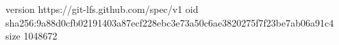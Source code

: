 version https://git-lfs.github.com/spec/v1
oid sha256:9a88d0cfb02191403a87ecf228ebc3e73a50c6ae3820275f7f23be7ab06a91c4
size 1048672
